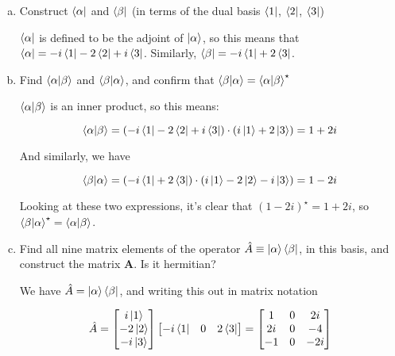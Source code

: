\documentclass[10pt]{article}
\begin{document}
    \begin{enumerate}[(a)]
    \item Construct $\bra \alpha$ and $\bra \beta$ (in terms of the dual basis $\bra 1$, $\bra 2$, $\bra 3$)
    
    \begin{solution}
        $\bra \alpha$ is defined to be the adjoint of $\ket \alpha$, so this means that $\bra \alpha = -i \bra{1} - 2 \bra{2} + i \bra{3}$. Similarly, $\bra \beta = -i\bra{1} + 2 \bra{3}$.
    \end{solution}
    \item Find $\bra \alpha \ket{\beta}$ and $\bra \beta \ket{\alpha}$, and confirm that $\bra{\beta}\ket{\alpha} = \bra {\alpha} \ket {\beta} ^\star$
    
    \begin{solution}
        $\bra{\alpha}\ket{\beta}$ is an inner product, so this means:


        \[ \bra{\alpha}\ket{\beta} = (-i \bra 1 - 2 \bra 2 + i \bra 3) \cdot (i \ket 1 + 2 \ket 3) =  1 + 2i\] 

        And similarly, we have 

        \[ \braket{\beta}{\alpha} = (-i \bra 1 + 2 \bra 3) \cdot (i \ket 1 - 2\ket 2 - i\ket 3) = 1 - 2i \]

        Looking at these two expressions, it's clear that $(1 - 2i)^\star = 1+2i$, so $\braket{\beta}{\alpha}^\star = \braket{\alpha}{\beta}$.
    \end{solution}
    \item Find all nine matrix elements of the operator $\hat A \equiv \ket{\alpha} \bra{\beta}$, in this basis, and construct the matrix $\mathbf{A}$. Is it hermitian?
    
    \begin{solution}
        We have $\hat A = \ket \alpha \bra \beta$, and writing this out in matrix notation

        \[\hat A =
        \begin{bmatrix}
           i\ket 1 \\
            -2 \ket 2 \\
            -i\ket 3 
            \end{bmatrix} \begin{bmatrix}
                -i\bra 1 & 0 & 2 \bra 3 
                \end{bmatrix}  = \begin{bmatrix}
                    1 & 0 & 2i \\
                    2i & 0 & -4 \\
                    -1 & 0 & -2i 
                    \end{bmatrix} \]


\end{solution}
\end{enumerate}
\end{document}
